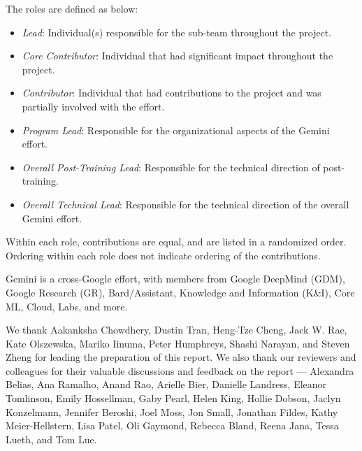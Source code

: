 \noindent The roles are defined as below:
\begin{itemize}
    \item \textit{Lead}: Individual(s) responsible for the sub-team throughout the project.
    \item \textit{Core Contributor}: Individual that had significant impact throughout the project.
    \item \textit{Contributor}: Individual that had contributions to the project and was partially involved with the effort. 
    \item \textit{Program Lead}:
    Responsible for the organizational aspects of the Gemini effort.
    \item \textit{Overall Post-Training Lead}: Responsible for the technical direction of post-training.
    \item \textit{Overall Technical Lead}:
    Responsible for the technical direction of the overall Gemini effort.
    
\end{itemize}

Within each role, contributions are equal, and are listed in a randomized order. Ordering within each role does not indicate ordering of the contributions. 

Gemini is a cross-Google effort, with members from Google DeepMind (GDM), Google Research (GR), Bard/Assistant, Knowledge and Information (K\&I), Core ML, Cloud, Labs, and more. 

We thank Aakanksha Chowdhery, Dustin Tran, Heng-Tze Cheng, Jack W. Rae, Kate Olszewska, Mariko Iinuma, Peter Humphreys, Shashi Narayan, and Steven Zheng for leading the preparation of this report. We also thank our reviewers and colleagues for their valuable discussions and feedback on the report --- Alexandra Belias, Ana Ramalho, Anand Rao, Arielle Bier, Danielle Landress, Eleanor Tomlinson, Emily Hossellman, Gaby Pearl, Helen King, Hollie Dobson, Jaclyn Konzelmann, Jennifer Beroshi, Joel Moss, Jon Small, Jonathan Fildes, Kathy Meier-Hellstern, Lisa Patel, Oli Gaymond, Rebecca Bland, Reena Jana, Tessa Lueth, and Tom Lue. 

